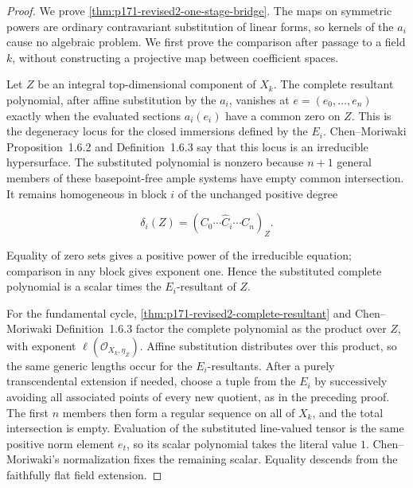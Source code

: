 \begin{proof}
We prove \cref{thm:p171-revised2-one-stage-bridge}.  The maps on
symmetric powers are ordinary contravariant substitution of linear forms,
so kernels of the \(a_i\) cause no algebraic problem.  We first prove the
comparison after passage to a field \(k\), without constructing a
projective map between coefficient spaces.

Let \(Z\) be an integral top-dimensional component of \(X_k\).  The
complete resultant polynomial, after affine substitution by the \(a_i\),
vanishes at \(e=(e_0,\ldots,e_n)\) exactly when the evaluated sections
\(a_i(e_i)\) have a common zero on \(Z\).  This is the degeneracy locus for
the closed immersions defined by the \(E_i\).  Chen--Moriwaki
Proposition~1.6.2 and Definition~1.6.3 say that this locus is an irreducible
hypersurface.  The substituted polynomial is nonzero because \(n+1\)
general members of these basepoint-free ample systems have empty common
intersection.  It remains homogeneous in block \(i\) of the unchanged
positive degree

\[
 \delta_i(Z)=(C_0\cdots\widehat C_i\cdots C_n)_Z.
\]

Equality of zero sets gives a positive power of the irreducible equation;
comparison in any block gives exponent one.  Hence the substituted complete
polynomial is a scalar times the \(E_i\)-resultant of \(Z\).

For the fundamental cycle,
\cref{thm:p171-revised2-complete-resultant} and Chen--Moriwaki
Definition~1.6.3 factor the complete polynomial as the product over \(Z\),
with exponent \(\ell(\mathcal O_{X_k,\eta_Z})\).  Affine substitution
distributes over this product, so the same generic lengths occur for the
\(E_i\)-resultants.  After a purely transcendental extension if needed,
choose a tuple from the \(E_i\) by successively avoiding all associated
points of every new quotient, as in the preceding proof.  The first \(n\)
members then form a regular sequence on all of \(X_k\), and the total
intersection is empty.  Evaluation of the substituted line-valued tensor
is the same positive norm element \(e_t\), so its scalar polynomial takes
the literal value \(1\).  Chen--Moriwaki's normalization fixes the remaining
scalar.  Equality descends from the faithfully flat field extension.


\end{proof}
